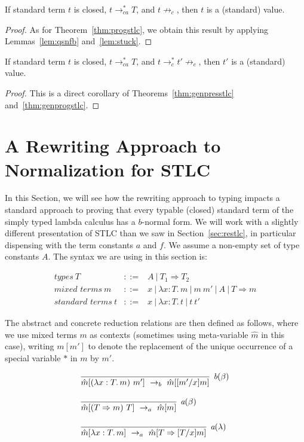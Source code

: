 \documentclass{LMCS}
\newcommand{\To}[0]{\Rightarrow}
\begin{document}
\begin{thm}
\label{thm:genprogstlc}
If standard term $t$ is closed, $t\to_{ca}^* T$, and $t\not\to_c$,
then $t$ is a (standard) value.
\end{thm}

\begin{proof} As for Theorem~\ref{thm:progstlc}, we obtain
this result by applying Lemmas~\ref{lem:qsnfb} and~\ref{lem:stuck}. 
\end{proof}

\begin{thm}
\label{thm:gensafety}
If standard term $t$ is closed, $t\to_{ca}^* T$, and $t\to_c^*
t'\not\to_c$, then $t'$ is a (standard) value.
\end{thm}
\begin{proof} This is a direct corollary of
Theorems~\ref{thm:genpresstlc} and~\ref{thm:genprogstlc}. \end{proof}

\section{A Rewriting Approach to Normalization for STLC}
\label{sec:normstlc}

In this Section, we will see how the rewriting approach to typing
impacts a standard approach to proving that every typable (closed)
standard term of the simply typed lambda calculus has a $b$-normal
form.  We will work with a slightly different presentation of STLC
than we saw in Section~\ref{sec:restlc}, in particular dispensing with
the term constants $a$ and $f$.  We assume a non-empty set of type
constants $A$.  The syntax we are using in this section is:

\[
\begin{array}{lll}
\textit{types}\ T & ::= & A\ |\ T_1\To T_2\\
\textit{mixed terms}\ m & ::= & x\ |\ \lambda x:T.\,m\ |\ m\ m'\ | \ A\ |\ T\To m \\
\textit{standard terms}\ t & ::= & x\ |\ \lambda x:T.\,t\ |\ t\ t'
\end{array}
\]

\noindent The abstract and concrete reduction relations are then
defined as follows, where we use mixed terms $m$ as contexts
(sometimes using meta-variable $\hat{m}$ in this case), writing
$m[m']$ to denote the replacement of the unique occurrence of a
special variable $*$ in $m$ by $m'$.  

\[
\begin{array}{lll}
\infer[\textit{b}(\beta)]{\hat{m}[(\lambda x:T.\,m)\ m']\ \to_b\ \hat{m}[[m'/x]m]}{\ }
\\\\
\infer[\textit{a}(\beta)]{\hat{m}[(T \To m)\ T]\ \to_a\ \hat{m}[m]}{\ }
\\\\
\infer[\textit{a}(\lambda)]{\hat{m}[\lambda x:T.\, m]\ \to_a\ \hat{m}[T\To [T/x]m]}{\ }
\end{array}
\]
\end{document}
